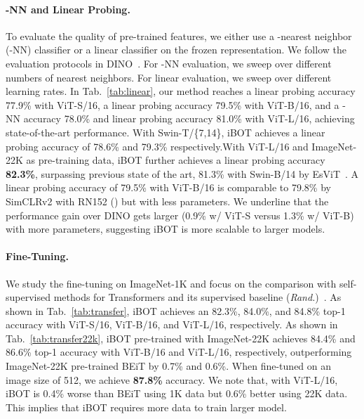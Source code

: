 \documentclass{article} \usepackage{iclr2022_conference,times}
\def\ourmethod{{iBOT}\xspace}
\begin{document}
\paragraph{-NN and Linear Probing.} 
To evaluate the quality of pre-trained features, we either use a -nearest neighbor (-NN) classifier or a linear classifier on the frozen representation. 
We follow the evaluation protocols in DINO~\citep{dino}. For -NN evaluation, we sweep over different numbers of nearest neighbors. 
For linear evaluation, we sweep over different learning rates. 
In Tab.~\ref{tab:linear}, our method reaches a linear probing accuracy 77.9\% with ViT-S/16, 
a linear probing accuracy 79.5\% with ViT-B/16, and a -NN accuracy 78.0\% and linear probing accuracy 81.0\% with ViT-L/16, achieving state-of-the-art performance.
With Swin-T/\{7,14\}, \ourmethod achieves a linear probing accuracy of 78.6\% and 79.3\% respectively.With ViT-L/16 and ImageNet-22K as pre-training data, \ourmethod further achieves a linear probing accuracy \textbf{82.3\%}, surpassing previous state of the art, 81.3\% with Swin-B/14 by EsViT~\citep{esvit}.
A linear probing accuracy of 79.5\% with ViT-B/16 is comparable to 79.8\% by SimCLRv2 with RN152 () but with  less parameters.
We underline that the performance gain over DINO gets larger (0.9\% w/ ViT-S versus 1.3\% w/ ViT-B) with more parameters, suggesting \ourmethod is more scalable to larger models.

\paragraph{Fine-Tuning.} 
We study the fine-tuning on ImageNet-1K and focus on the comparison with self-supervised methods for Transformers and its supervised baseline (\textit{Rand.})~\citep{deit}. 
As shown in Tab.~\ref{tab:transfer}, \ourmethod achieves an 82.3\%, 84.0\%, and 84.8\% top-1 accuracy with ViT-S/16, ViT-B/16, and ViT-L/16, respectively.
As shown in Tab.~\ref{tab:transfer22k}, \ourmethod pre-trained with ImageNet-22K achieves 84.4\% and 86.6\% top-1 accuracy with ViT-B/16 and ViT-L/16, respectively, outperforming ImageNet-22K pre-trained BEiT by 0.7\% and 0.6\%. 
When fine-tuned on an image size of 512, we achieve \textbf{87.8\%} accuracy.
We note that, with ViT-L/16, \ourmethod is 0.4\% worse than BEiT using 1K data but 0.6\% better using 22K data. This implies that \ourmethod requires more data to train larger model.
\end{document}
